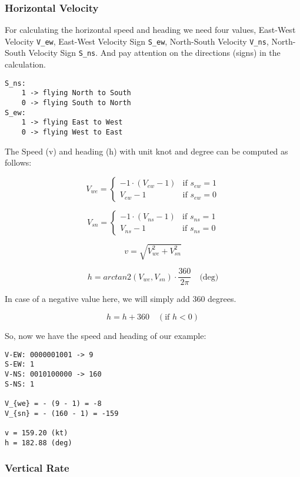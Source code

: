 \subsubsection{Horizontal Velocity}\label{horizontal-velocity}

For calculating the horizontal speed and heading we need four values,
East-West Velocity \texttt{V\_ew}, East-West Velocity Sign
\texttt{S\_ew}, North-South Velocity \texttt{V\_ns}, North-South
Velocity Sign \texttt{S\_ns}. And pay attention on the directions
(signs) in the calculation.

\begin{verbatim}
S_ns:
    1 -> flying North to South
    0 -> flying South to North
S_ew:
    1 -> flying East to West
    0 -> flying West to East
\end{verbatim}

The Speed (v) and heading (h) with unit knot and degree can be computed
as follows:

\[V_{we} =
\begin{cases}
 -1 \cdot (V_{ew} - 1)    & \text{if } s_{ew} = 1 \\
 V_{ew} - 1         & \text{if } s_{ew} = 0
\end{cases}\]

\[V_{sn} =
\begin{cases}
 -1 \cdot (V_{ns} - 1)    & \text{if } s_{ns} = 1 \\
 V_{ns} - 1         & \text{if } s_{ns} = 0
\end{cases}\]

\[v = \sqrt{V_{we}^{2} + V_{sn}^{2}}\]

\[h = arctan2 \left( V_{we}, V_{sn} \right) \cdot \frac{360}{2\pi}  \quad \text{(deg)}\]

In case of a negative value here, we will simply add 360 degrees.

\[h = h + 360  \quad (\text{if } h < 0)\]

So, now we have the speed and heading of our example:

\begin{verbatim}
V-EW: 0000001001 -> 9
S-EW: 1
V-NS: 0010100000 -> 160
S-NS: 1

V_{we} = - (9 - 1) = -8
V_{sn} = - (160 - 1) = -159

v = 159.20 (kt)
h = 182.88 (deg)
\end{verbatim}

\subsubsection{Vertical Rate}\label{vertical-rate}

